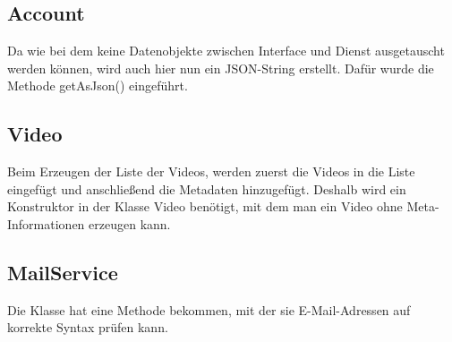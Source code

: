 \subsection{Account}
Da wie bei dem  keine Datenobjekte zwischen Interface und Dienst ausgetauscht werden können, wird auch hier nun ein JSON-String erstellt. Dafür wurde die Methode getAsJson() eingeführt.

\subsection{Video}
Beim Erzeugen der Liste der Videos, werden zuerst die Videos in die Liste eingefügt und anschließend die Metadaten hinzugefügt. Deshalb wird ein Konstruktor in der Klasse Video benötigt, mit dem man ein Video ohne Meta-Informationen erzeugen kann.

\subsection{MailService}
Die Klasse hat eine Methode bekommen, mit der sie E-Mail-Adressen auf korrekte Syntax prüfen kann.